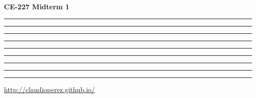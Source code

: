 \documentclass[9pt,landscape]{article}
\begin{document}
\raggedright
\footnotesize



\begin{multicols}{4}


\setlength{\premulticols}{1pt}
\setlength{\postmulticols}{1pt}
\setlength{\multicolsep}{1pt}
\setlength{\columnsep}{2pt}

\begin{center}
     \Large{\textbf{CE-227 Midterm 1}} \\
\end{center}

\vspace{2mm}


\hrule

\vspace{1.5mm}

\hrule
\vspace{1.5mm}



\vspace{1.5mm}

\hrule

\vspace{1.5mm}

\hrule
\vspace{1.5mm}


\vspace{1.5mm}

\hrule
\vspace{1.5mm}

\vspace{1.5mm}

\hrule


\vspace{1.5mm}

\hrule

\vspace{1.5mm}

\hrule

\rule{0.3\linewidth}{0.25pt}
\scriptsize


\href{http://claudioperez.github.io/}{http://claudioperez.github.io/}


\end{multicols}
\end{document}
